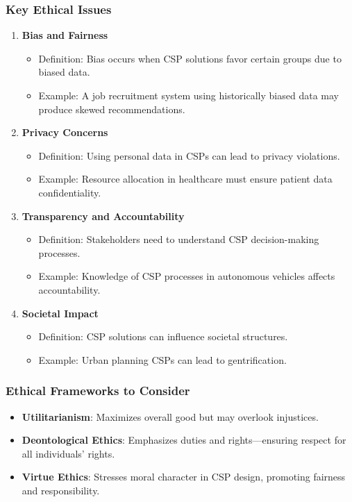 \documentclass[aspectratio=169]{beamer}
\begin{document}
\begin{frame}[fragile]
    \frametitle{Key Ethical Issues}
    \begin{enumerate}
        \item \textbf{Bias and Fairness}
            \begin{itemize}
                \item Definition: Bias occurs when CSP solutions favor certain groups due to biased data.
                \item Example: A job recruitment system using historically biased data may produce skewed recommendations.
            \end{itemize}
        \item \textbf{Privacy Concerns}
            \begin{itemize}
                \item Definition: Using personal data in CSPs can lead to privacy violations.
                \item Example: Resource allocation in healthcare must ensure patient data confidentiality.
            \end{itemize}
        \item \textbf{Transparency and Accountability}
            \begin{itemize}
                \item Definition: Stakeholders need to understand CSP decision-making processes.
                \item Example: Knowledge of CSP processes in autonomous vehicles affects accountability.
            \end{itemize}
        \item \textbf{Societal Impact}
            \begin{itemize}
                \item Definition: CSP solutions can influence societal structures.
                \item Example: Urban planning CSPs can lead to gentrification.
            \end{itemize}
    \end{enumerate}
\end{frame}

\begin{frame}[fragile]
    \frametitle{Ethical Frameworks to Consider}
    \begin{itemize}
        \item \textbf{Utilitarianism}: Maximizes overall good but may overlook injustices.
        \item \textbf{Deontological Ethics}: Emphasizes duties and rights—ensuring respect for all individuals' rights.
        \item \textbf{Virtue Ethics}: Stresses moral character in CSP design, promoting fairness and responsibility.
    \end{itemize}
\end{frame}
\end{document}
